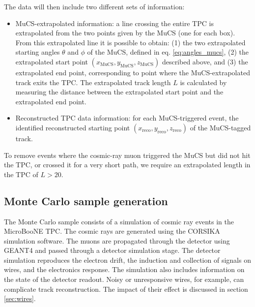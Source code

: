 \documentclass[a4paper,11pt]{article}
\begin{document}
The data will then include two different sets of information:
\begin{itemize}
  \item MuCS-extrapolated information: a line crossing the entire TPC is extrapolated from the two points given by the MuCS (one for each box). From this extrapolated line it is possible to obtain: (1) the two extrapolated starting angles $\theta$ and $\phi$ of the MuCS, defined in eq. \eqref{eq:angles_mucs}, (2) the extrapolated start point $(x_{\mathrm{MuCS}},y_{\mathrm{MuCS}},z_{\mathrm{MuCS}})$ described above, and (3) the extrapolated end point, corresponding to point where the MuCS-extrapolated track exits the TPC. The extrapolated track length $L$ is calculated by measuring the distance between the extrapolated start point and the extrapolated end point.
  \item Reconstructed TPC data information: for each MuCS-triggered event, the identified reconstructed starting point $(x_{\mathrm{reco}},y_{\mathrm{reco}},z_{\mathrm{reco}})$ of the MuCS-tagged track.
\end{itemize}
To remove events where the cosmic-ray muon triggered the MuCS but did not hit the TPC, or crossed it for a very short path, we require an extrapolated length in the TPC of $L > 20$.

\subsection{Monte Carlo sample generation}\label{sec:mcgen}

The Monte Carlo sample consists of a simulation of cosmic ray events in the MicroBooNE TPC. The cosmic rays are generated using the CORSIKA \cite{corsika} simulation software. The muons are propagated through the detector using GEANT4 \cite{geant} and passed through a detector simulation stage. The detector simulation reproduces the electron drift, the induction and collection of signals on wires, and the electronics response. The simulation also includes information on the state of the detector readout. Noisy or unresponsive wires, for example, can complicate track reconstruction. The impact of their effect is discussed in section \ref{sec:wires}.
\end{document}
